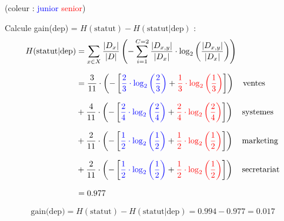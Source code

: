 \documentclass{article}
\begin{document}
\vspace{0.45cm}
(coleur : \textcolor{blue}{junior} \textcolor{red}{senior})

\vspace{0.15cm}

Calcule gain(dep) = $H(\text{statut}) - H(\text{statut} | \text{dep})$ :
\begin{align*}
    H(\text{statut} | \text{dep}) &= \sum_{x\in X} \dfrac{|D_x|}{|D|} \left( - \sum_{i=1} ^{C=2} \dfrac{|D_{x,y}|}{|D_x|} \cdot \log_2 \left( \dfrac{|D_{x,y}|}{|D_x|} \right) \right)\\[0.25cm]
                                  &= \dfrac{3}{11} \cdot \left( - \left[ \textcolor{blue}{\dfrac{2}{3} \cdot \log_2\left (\dfrac{2}{3} \right)} +   \textcolor{red}{\dfrac{1}{3} \cdot \log_2\left (\dfrac{1}{3} \right)} \right]  \right) \quad \text{ventes}\\[0.25cm]
                                  &+ \dfrac{4}{11} \cdot \left( - \left[ \textcolor{blue}{\dfrac{2}{4} \cdot \log_2\left (\dfrac{2}{4} \right)} +   \textcolor{red}{\dfrac{2}{4} \cdot \log_2\left (\dfrac{2}{4} \right)} \right]  \right) \quad \text{systemes}\\[0.25cm]
                                  &+ \dfrac{2}{11} \cdot \left( - \left[ \textcolor{blue}{\dfrac{1}{2} \cdot \log_2\left (\dfrac{1}{2} \right)} +   \textcolor{red}{\dfrac{1}{2} \cdot \log_2\left (\dfrac{1}{2} \right)} \right]  \right) \quad \text{marketing}\\[0.25cm]
                                  &+ \dfrac{2}{11} \cdot \left( - \left[ \textcolor{blue}{\dfrac{1}{2} \cdot \log_2\left (\dfrac{1}{2} \right)} +   \textcolor{red}{\dfrac{1}{2} \cdot \log_2\left (\dfrac{1}{2} \right)} \right]  \right) \quad \text{secretariat}\\[0.25cm]
                                  & = 0.977
\end{align*}

\[\text{gain(dep)} = H(\text{statut}) - H(\text{statut} | \text{dep}) = 0.994 - 0.977 = 0.017\]


\newpage
\end{document}

